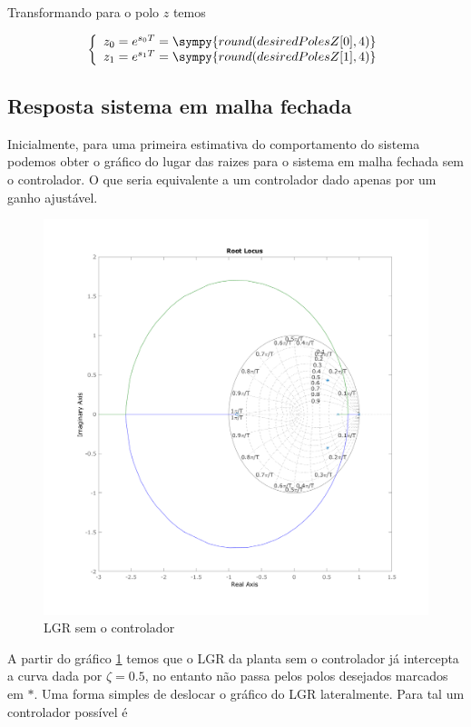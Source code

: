 \documentclass[a4paper,11pt]{article}
\begin{document}
Transformando para o polo $z$ temos

$$
\left\{
\begin{array}{l}
    z_0 = e^{s_0 T} = \sympy{round(desiredPolesZ[0],4)}\\
    z_1 = e^{s_1 T} = \sympy{round(desiredPolesZ[1],4)}
\end{array}
\right.
$$

\subsection{Resposta sistema em malha fechada}


Inicialmente, para uma primeira estimativa do comportamento do sistema podemos obter o gráfico do lugar das raizes para o sistema em malha fechada sem o controlador. O que seria equivalente a um controlador dado apenas por um ganho ajustável.

\begin{figure}[H]
    \centering
    \includegraphics[width=0.9\linewidth]{img/exsim3-rlocus-g2.png}
    \caption{LGR sem o controlador}
    \label{fig:ex3-rlocus-g2}
\end{figure}

A partir do gráfico \ref{fig:ex3-rlocus-g2} temos que o LGR da planta sem o controlador já intercepta a curva dada por $\zeta = 0.5$, no entanto não passa pelos polos desejados marcados em $*$. Uma forma simples de deslocar o gráfico do LGR lateralmente. Para tal um controlador possível é
\end{document}
